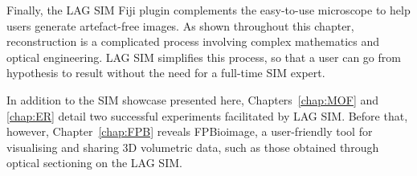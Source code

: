 Finally, the LAG SIM Fiji plugin complements the easy-to-use microscope to help users generate artefact-free images. 
As shown throughout this chapter, reconstruction is a complicated process involving complex mathematics and optical engineering. 
LAG SIM simplifies this process, so that a user can go from hypothesis to result without the need for a full-time SIM expert. 

In addition to the SIM showcase presented here, Chapters~\ref{chap:MOF} and \ref{chap:ER} detail two successful experiments facilitated by LAG SIM. 
Before that, however, Chapter~\ref{chap:FPB} reveals FPBioimage, a user-friendly tool for visualising and sharing 3D volumetric data, such as those obtained through optical sectioning on the LAG SIM. 